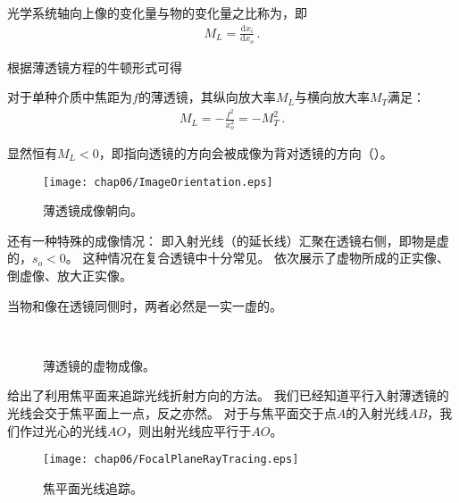 \begin{definition}
    光学系统轴向上像的变化量与物的变化量之比称为，即
    \begin{align}
        M_L=\frac{\mathrm{d}x_i}{\mathrm{d}x_o}\, .
    \end{align}
\end{definition}
根据薄透镜方程的牛顿形式可得
\begin{corollary}
    对于单种介质中焦距为$f$的薄透镜，其纵向放大率$M_L$与横向放大率$M_T$满足：
    \begin{align}
        M_L=-\frac{f^2}{x_o^2}=-M_T^2\, .
    \end{align}
\end{corollary}
显然恒有$M_L<0$，即指向透镜的方向会被成像为背对透镜的方向（）。
\begin{figure}[htbp]
    \centering\texttt{[image: chap06/ImageOrientation.eps]}
    \caption{薄透镜成像朝向。}
    \label{fig:6.41}
\end{figure}

还有一种特殊的成像情况：
即入射光线（的延长线）汇聚在透镜右侧，即物是虚的，$s_o<0$。
这种情况在复合透镜中十分常见。
依次展示了虚物所成的正实像、倒虚像、放大正实像。
\begin{corollary}
    当物和像在透镜同侧时，两者必然是一实一虚的。
\end{corollary}
\begin{figure}[htbp]
    \centering
    \,
    \\
    \caption{薄透镜的虚物成像。}
    \label{fig:6.42}
\end{figure}

给出了利用焦平面来追踪光线折射方向的方法。
我们已经知道平行入射薄透镜的光线会交于焦平面上一点，反之亦然。
对于与焦平面交于点$A$的入射光线$AB$，我们作过光心的光线$AO$，则出射光线应平行于$AO$。
\begin{figure}[htbp]
    \centering\texttt{[image: chap06/FocalPlaneRayTracing.eps]}
    \caption{焦平面光线追踪。}
    \label{fig:6.43}
\end{figure}

